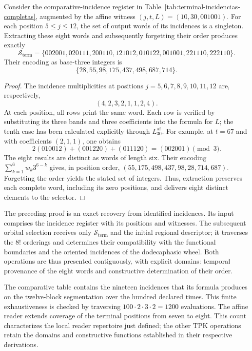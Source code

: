 \begin{proposition}
\label{prop:repertorio-terminal-ocho-incidencias}
Consider the comparative-incidence register in
Table~\ref{tab:terminal-incidencias-completas}, augmented by the affine
witness $(j,t,L)=(10,30,001001)$. For each position $5\leq j\leq12$, the
set of output words of its incidences is a singleton.
Extracting these eight words and subsequently forgetting their order
produces exactly
\[
 \mathcal S_{\mathrm{term}}=
 \{002001,020111,200110,121012,010122,001001,221110,222110\}.
\]
Their encoding as base-three integers is
\[
 \{28,55,98,175,437,498,687,714\}.
\]
\end{proposition}
\begin{proof}
The incidence multiplicities at positions $j=5,6,7,8,9,10,11,12$
are, respectively,
\[
 (4,2,3,2,1,1,2,4).
\]
At each position, all rows print the same word. Each row
is verified by substituting its three bands and three coefficients into the
formula for $L$; the tenth case has been calculated explicitly through
$L^{\mathrm{af}}_{30}$. For example, at $t=67$ and with coefficients
$(2,1,1)$, one obtains
\[
 2(010012)+(001220)+(011120)=(002001)\pmod3.
\]
The eight results are distinct as words of length six. Their
encoding $\sum_{k=1}^{6}w_k3^{6-k}$ gives, in position
order, $(55,175,498,437,98,28,714,687)$. Forgetting the order
yields the stated set of integers. Thus, extraction preserves
each complete word, including its zero positions, and delivers eight
distinct elements to the selector.
\end{proof}

The preceding proof is an exact recovery from identified
incidences. Its input comprises the incidence register
with its positions and witnesses. The subsequent orbital selection receives
only $\mathcal S_{\mathrm{term}}$ and the initial regional descriptor;
it traverses the $8!$ orderings and determines their compatibility with the
functional boundaries and the oriented incidences of the dodecaphasic
wheel. Both operations are thus presented contiguously, with explicit
domains: temporal provenance of the eight words and constructive
determination of their order.

The comparative table contains the nineteen incidences that its formula
produces on the twelve-block segmentation over the hundred declared
times. This finite exhaustiveness is checked by traversing
$100\cdot2\cdot3\cdot2=1200$ evaluations. The affine reader extends
coverage of the terminal positions from seven to eight. This count
characterizes the local reader repertoire just defined;
the other TPK operations retain the domains and constructive functions
established in their respective derivations.

